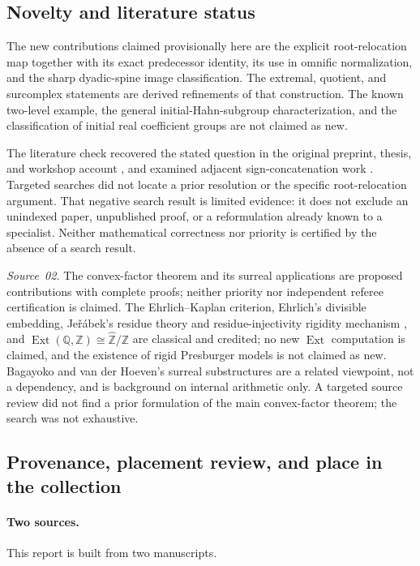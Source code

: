 \documentclass[11pt]{article}
\theoremstyle{definition}
\theoremstyle{remark}
\newcommand{\Z}{\mathbb{Z}}
\newcommand{\Q}{\mathbb{Q}}
\newcommand{\Zhat}{\widehat{\Z}}
\newcommand{\Ext}{\operatorname{Ext}}
\begin{document}
\subsection{Novelty and literature status}
The new contributions claimed provisionally here are the explicit
root-relocation map together with its exact predecessor identity, its
use in omnific normalization, and the sharp dyadic-spine image
classification. The extremal, quotient, and surcomplex statements are
derived refinements of that construction. The known two-level example,
the general initial-Hahn-subgroup characterization, and the classification
of initial real coefficient groups are not claimed as new.

The literature check recovered the stated question in the original
preprint, thesis, and workshop account \cite{EK,Kaplan,Workshop}, and
examined adjacent sign-concatenation work \cite{BagHoeven}. Targeted
searches did not locate a prior resolution or the specific root-relocation
argument. That negative search result is limited evidence: it does not
exclude an unindexed paper, unpublished proof, or a reformulation already
known to a specialist. Neither mathematical correctness nor priority is
certified by the absence of a search result.

\emph{Source~02.} The convex-factor theorem and its surreal applications
are proposed contributions with complete proofs; neither priority nor
independent referee certification is claimed. The Ehrlich--Kaplan
criterion, Ehrlich's divisible embedding, Je\v r\'abek's residue theory
and residue-injectivity rigidity mechanism \cite{Jerabek}, and
$\Ext(\Q,\Z)\cong\Zhat/\Z$ \cite{Strickland} are classical and credited;
no new $\Ext$ computation is claimed, and the existence of rigid
Presburger models is not claimed as new. Bagayoko and van der Hoeven's
surreal substructures \cite{BagHoeven} are a related viewpoint, not a
dependency, and \cite{EnayatHamkinsWcislo} is background on internal
arithmetic only. A targeted source review did not find a prior
formulation of the main convex-factor theorem; the search was not
exhaustive.

\subsection{Provenance, placement review, and place in the collection}
\label{isg:sec:provenance}

\paragraph{Two sources.} This report is built from two manuscripts.
\end{document}
